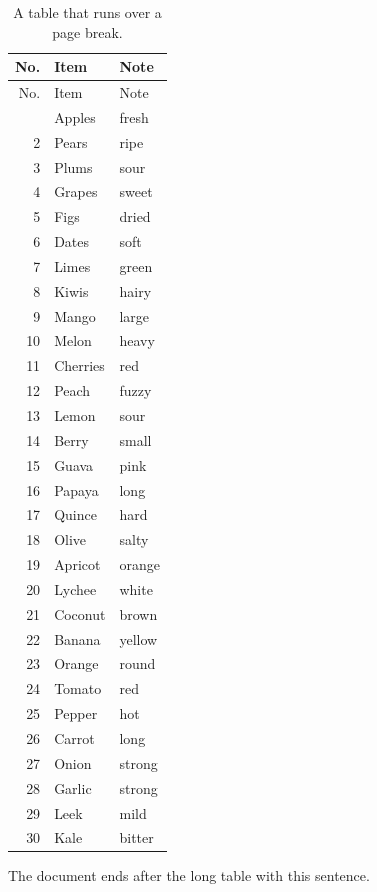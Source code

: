 \documentclass[11pt]{article}
\begin{document}
\begin{longtable}{rll}
\caption{A table that runs over a page break.}\\
\toprule
No. & Item & Note \\
\midrule
\endfirsthead
\toprule
No. & Item & Note \\
\midrule
\endhead
\bottomrule
\endfoot
1 & Apples & fresh \\ 2 & Pears & ripe \\ 3 & Plums & sour \\ 4 & Grapes & sweet \\ 5 & Figs & dried \\
6 & Dates & soft \\ 7 & Limes & green \\ 8 & Kiwis & hairy \\ 9 & Mango & large \\ 10 & Melon & heavy \\
11 & Cherries & red \\ 12 & Peach & fuzzy \\ 13 & Lemon & sour \\ 14 & Berry & small \\ 15 & Guava & pink \\
16 & Papaya & long \\ 17 & Quince & hard \\ 18 & Olive & salty \\ 19 & Apricot & orange \\ 20 & Lychee & white \\
21 & Coconut & brown \\ 22 & Banana & yellow \\ 23 & Orange & round \\ 24 & Tomato & red \\ 25 & Pepper & hot \\
26 & Carrot & long \\ 27 & Onion & strong \\ 28 & Garlic & strong \\ 29 & Leek & mild \\ 30 & Kale & bitter \\
\end{longtable}
The document ends after the long table with this sentence.
\end{document}
